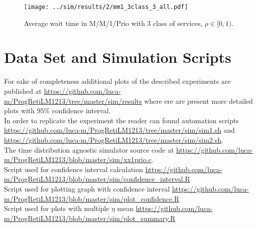 \documentclass{llncs}
\begin{document}
\begin{figure}
\centering
\texttt{[image: ../sim/results/2/mm1\_3class\_3\_all.pdf]}
\caption{Average wait time in M/M/1/Prio with 3 class of services, $\rho \in [0,1)$.}
\label{fig:mm1_3class_3_all}
\end{figure}
\newpage



\appendix

\section{Data Set and Simulation Scripts}
For sake of completeness additional plots of the described experiments are published at \url{https://github.com/luca-m/ProgRetiLM1213/tree/master/sim/results} where ere are present more detailed plots with 95\% confidence interval.\\
In order to replicate the experiment the reader can found automation scripts \url{https://github.com/luca-m/ProgRetiLM1213/tree/master/sim/sim1.sh} and \url{https://github.com/luca-m/ProgRetiLM1213/tree/master/sim/sim2.sh}.\\
The time distribution agnostic simulator source code at \url{https://github.com/luca-m/ProgRetiLM1213/blob/master/sim/xx1prio.c}. \\
Script used for confidence interval calculation \url{https://github.com/luca-m/ProgRetiLM1213/blob/master/sim/confidence_interval.R} \\
Script used for plotting graph with confidence interval \url{https://github.com/luca-m/ProgRetiLM1213/blob/master/sim/plot_confidence.R}\\
Script used for plots with multiple $\eta$ mean \url{https://github.com/luca-m/ProgRetiLM1213/blob/master/sim/plot_summary.R}
\end{document}
